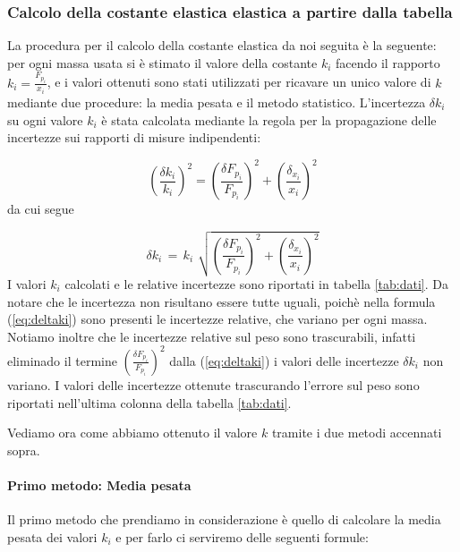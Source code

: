 \subsubsection{Calcolo della costante elastica elastica a partire dalla tabella}

La procedura per il calcolo della costante elastica da noi seguita è la seguente:
per ogni massa usata si è stimato il valore della costante $k_i$ facendo il rapporto $k_{i} = \frac{F_{p_{i}}}{x_{i}}$,
e i valori ottenuti sono stati utilizzati per ricavare un unico valore di $k$ mediante due procedure: la media pesata e il metodo statistico.
L'incertezza $\delta k_{i}$ su ogni valore $k_i$ è stata calcolata mediante la regola per la propagazione delle incertezze sui rapporti di misure indipendenti:

\begin{equation*}
	\left(\frac{\delta {k_{i}}}{k_{i}}\right)^2 = \left(\frac{\delta F_{p_{i}}}{F_{p_{i}}}\right)^2 + \left(\frac{\delta_{x_{i}}}{x_{i}}\right)^2 
\end{equation*}
%
da cui segue

\begin{equation}
	\delta k_{i} \,=\, k_i\,\, \sqrt{\left(\frac{\delta F_{p_{i}}}{F_{p_{i}}}\right)^2 + \left(\frac{\delta_{x_{i}}}{x_{i}}\right)^2} 
    \label{eq:deltaki}
\end{equation}
%
I valori $k_i$ calcolati e le relative incertezze sono riportati in tabella \ref{tab:dati}. Da notare che le incertezza
non risultano essere tutte uguali, poichè nella formula (\ref{eq:deltaki}) sono presenti le incertezze relative, che
variano per ogni massa. Notiamo inoltre che le incertezze relative sul peso sono trascurabili, infatti eliminado il termine
$\left(\frac{\delta F_{p_{i}}}{F_{p_{i}}}\right)^2$ dalla (\ref{eq:deltaki}) i valori delle incertezze $\delta k_i$ non variano.
I valori delle incertezze ottenute trascurando l'errore sul peso sono riportati nell'ultima colonna della tabella \ref{tab:dati}.

Vediamo ora come abbiamo ottenuto il valore $k$ tramite i due metodi accennati sopra.

\paragraph{Primo metodo: Media pesata\\}

Il primo metodo che prendiamo in considerazione è quello di calcolare la media pesata dei valori $k_{i}$ e per farlo ci serviremo delle seguenti formule:

